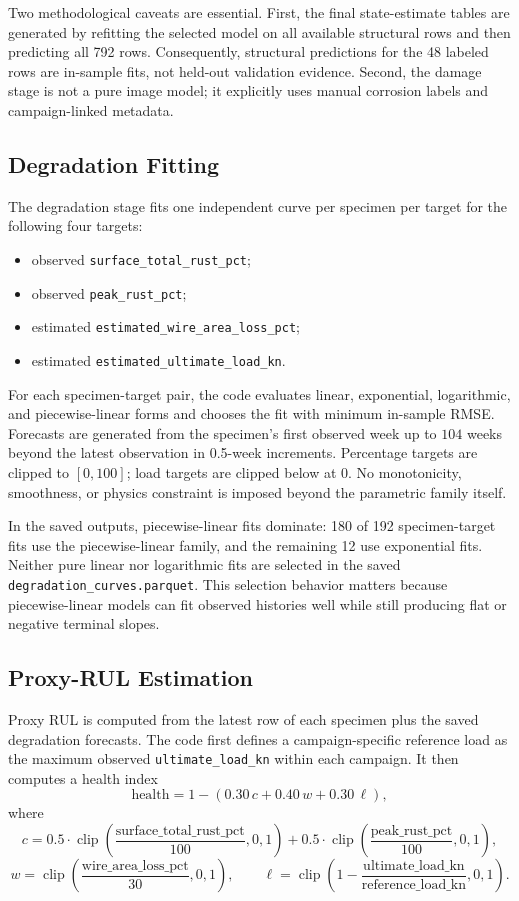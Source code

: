 \documentclass[11pt,a4paper]{article}
\begin{document}
Two methodological caveats are essential. First, the final state-estimate tables are generated by refitting the selected model on all available structural rows and then predicting all 792 rows. Consequently, structural predictions for the 48 labeled rows are in-sample fits, not held-out validation evidence. Second, the damage stage is not a pure image model; it explicitly uses manual corrosion labels and campaign-linked metadata.

\subsection{Degradation Fitting}

The degradation stage fits one independent curve per specimen per target for the following four targets:
\begin{itemize}
  \item observed \texttt{surface\_total\_rust\_pct};
  \item observed \texttt{peak\_rust\_pct};
  \item estimated \texttt{estimated\_wire\_area\_loss\_pct};
  \item estimated \texttt{estimated\_ultimate\_load\_kn}.
\end{itemize}

For each specimen-target pair, the code evaluates linear, exponential, logarithmic, and piecewise-linear forms and chooses the fit with minimum in-sample RMSE. Forecasts are generated from the specimen's first observed week up to \(104\) weeks beyond the latest observation in 0.5-week increments. Percentage targets are clipped to \([0,100]\); load targets are clipped below at 0. No monotonicity, smoothness, or physics constraint is imposed beyond the parametric family itself.

In the saved outputs, piecewise-linear fits dominate: 180 of 192 specimen-target fits use the piecewise-linear family, and the remaining 12 use exponential fits. Neither pure linear nor logarithmic fits are selected in the saved \texttt{degradation\_curves.parquet}. This selection behavior matters because piecewise-linear models can fit observed histories well while still producing flat or negative terminal slopes.

\subsection{Proxy-RUL Estimation}

Proxy RUL is computed from the latest row of each specimen plus the saved degradation forecasts. The code first defines a campaign-specific reference load as the maximum observed \texttt{ultimate\_load\_kn} within each campaign. It then computes a health index
\[
\text{health} = 1 - \left(0.30\,c + 0.40\,w + 0.30\,\ell\right),
\]
where
\[
c = 0.5\cdot \operatorname{clip}\!\left(\frac{\text{surface\_total\_rust\_pct}}{100},0,1\right)
  + 0.5\cdot \operatorname{clip}\!\left(\frac{\text{peak\_rust\_pct}}{100},0,1\right),
\]
\[
w = \operatorname{clip}\!\left(\frac{\text{wire\_area\_loss\_pct}}{30},0,1\right),
\qquad
\ell = \operatorname{clip}\!\left(1 - \frac{\text{ultimate\_load\_kn}}{\text{reference\_load\_kn}},0,1\right).
\]
\end{document}
